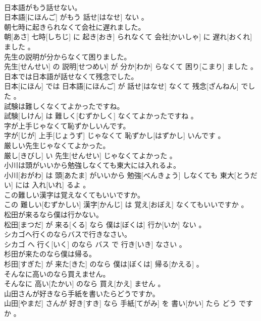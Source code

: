 \documentclass[8pt]{extreport}
\begin{document}
\begin{CJK}{UTF8}{min}
\\	日本語がもう話せない。	
\\	日本語[にほんご] がもう 話せ[はなせ] ない 。
\\	朝七時に起きられなくて会社に遅れました。	
\\	朝[あさ] 七時[しちじ] に 起き[おき] られなくて 会社[かいしゃ] に 遅れ[おくれ] ました 。
\\	先生の説明が分からなくて困りました。	
\\	先生[せんせい] の 説明[せつめい] が 分か[わか] らなくて 困り[こまり] ました 。
\\	日本では日本語が話せなくて残念でした。	
\\	日本[にほん] では 日本語[にほんご] が 話せ[はなせ] なくて 残念[ざんねん] でした 。
\\	試験は難しくなくてよかったですね。	
\\	試験[しけん] は 難しく[むずかしく] なくてよかったですね 。
\\	字が上手じゃなくて恥ずかしいんです。	
\\	字が[じが] 上手[じょうず] じゃなくて 恥ずかし[はずかし] いんです 。
\\	厳しい先生じゃなくてよかった。	
\\	厳し[きびし] い 先生[せんせい] じゃなくてよかった 。
\\	小川は頭がいいから勉強しなくても東大には入れるよ。	
\\	小川[おがわ] は 頭[あたま] がいいから 勉強[べんきょう] しなくても 東大[とうだい] には 入れ[いれ] るよ 。
\\	この難しい漢字は覚えなくてもいいですか。	
\\	この 難しい[むずかしい] 漢字[かんじ] は 覚え[おぼえ] なくてもいいですか 。
\\	松田が来るなら僕は行かない。	
\\	松田[まつだ] が 来る[くる] なら 僕は[ぼくは] 行か[いか] ない 。
\\	シカゴへ行くのならバスで行きなさい。	
\\	シカゴ へ 行く[いく] のなら バス で 行き[いき] なさい 。
\\	杉田が来たのなら僕は帰る。	
\\	杉田[すぎた] が 来た[きた] のなら 僕は[ぼくは] 帰る[かえる] 。
\\	そんなに高いのなら買えません。	
\\	そんなに 高い[たかい] のなら 買え[かえ] ません 。
\\	山田さんが好きなら手紙を書いたらどうですか。	
\\	山田[やまだ] さんが 好き[すき] なら 手紙[てがみ] を 書い[かい] たら どう ですか 。

\end{CJK}
\end{document}
